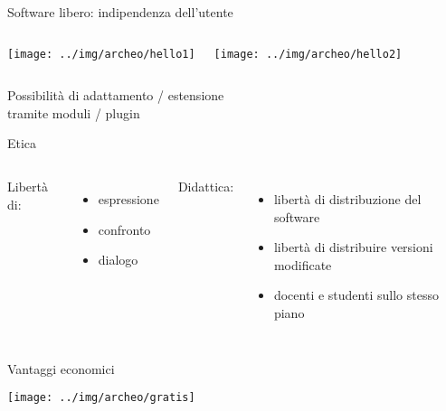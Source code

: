 \documentclass[xcolor=svgnames]{beamer}
\begin{document}

		\begin{frame}{Software libero: indipendenza dell'utente}
			\begin{columns}[c]
					\begin{center}
						\texttt{[image: ../img/archeo/hello1]}
					\end{center}
					\begin{center}
						\texttt{[image: ../img/archeo/hello2]}
					\end{center}
			\end{columns}
			\vfill
			\begin{center}
				Possibilità di adattamento / estensione\\tramite moduli / plugin
			\end{center}
			\end{frame}


		\begin{frame}{Etica}
			\begin{columns}[c]
					Libertà di:
					\begin{itemize}
						\item espressione
						\item confronto
						\item dialogo
					\end{itemize}
					Didattica:
					\begin{itemize}
						\item libertà di distribuzione del software
						\item libertà di distribuire versioni modificate
						\item docenti e studenti sullo stesso piano
					\end{itemize}
			\end{columns}
		\end{frame}


		\begin{frame}{Vantaggi economici}
			\begin{center}
				\texttt{[image: ../img/archeo/gratis]}
			\end{center}
		\end{frame}
\end{document}
